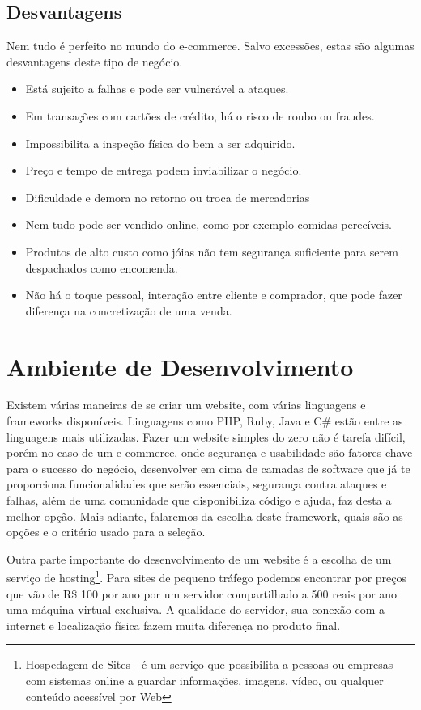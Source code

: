 \subsection{Desvantagens}

Nem tudo é perfeito no mundo do e-commerce. Salvo excessões, estas são algumas desvantagens deste tipo de negócio.

\begin{itemize}
  \item Está sujeito a falhas e pode ser vulnerável a ataques.
  \item Em transações com cartões de crédito, há o risco de roubo ou fraudes.
  \item Impossibilita a inspeção física do bem a ser adquirido.
  \item Preço e tempo de entrega podem inviabilizar o negócio.
  \item Dificuldade e demora no retorno ou troca de mercadorias
  \item Nem tudo pode ser vendido online, como por exemplo comidas perecíveis.
  \item Produtos de alto custo como jóias não tem segurança suficiente para serem despachados como encomenda.
  \item Não há o toque pessoal, interação entre cliente e comprador, que pode fazer diferença na concretização de uma venda.
\end{itemize}


\section{Ambiente de Desenvolvimento}

Existem várias maneiras de se criar um website, com várias linguagens e frameworks disponíveis. Linguagens como PHP, Ruby, Java e C\# estão entre as linguagens mais utilizadas\cite{UsageStatistics}. Fazer um website simples do zero não é tarefa difícil, porém no caso de um e-commerce, onde segurança e usabilidade são fatores chave para o sucesso do negócio, desenvolver em cima de camadas de software que já te proporciona funcionalidades que serão essenciais, segurança contra ataques e falhas, além de uma comunidade que disponibiliza código e ajuda, faz desta a melhor opção. Mais adiante, falaremos da escolha deste framework, quais são as opções e o critério usado para a seleção.

Outra parte importante do desenvolvimento de um website é a escolha de um serviço de hosting\footnote{Hospedagem de Sites - é um serviço que possibilita a pessoas ou empresas com sistemas online a guardar informações, imagens, vídeo, ou qualquer conteúdo acessível por Web}. Para sites de pequeno tráfego podemos encontrar por preços que vão de R\$ 100 por ano por um servidor compartilhado a 500 reais por ano uma máquina virtual exclusiva. A qualidade do servidor, sua conexão com a internet e localização física fazem muita diferença no produto final.

